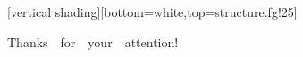 \section[]{}
[vertical
shading][bottom=white,top=structure.fg!25]
\begin{frame}
 \begin{center}
{\huge\textcolor[rgb]{0.50,0.00,1.00}{Thanks~~for~~your~~attention!}}
\end{center}
\end{frame}

